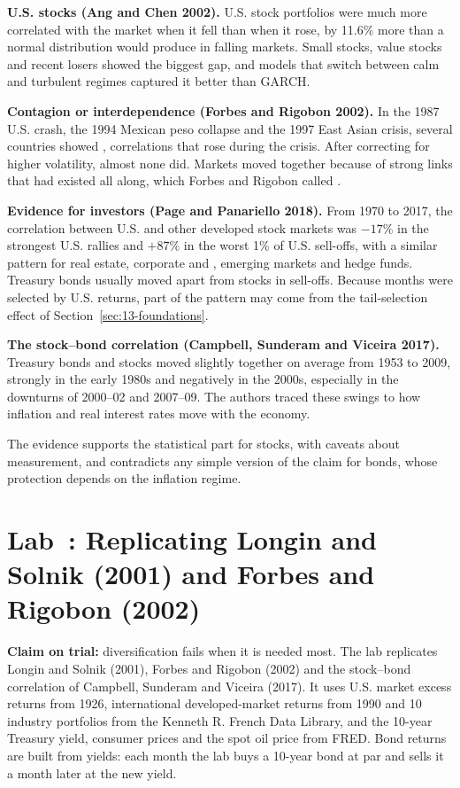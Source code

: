 \textbf{U.S. stocks (Ang and Chen 2002).} U.S. stock portfolios were much more correlated with the market when it fell than when it rose, by 11.6\% more than a normal distribution would produce in falling markets. Small stocks, value stocks and recent losers showed the biggest gap, and models that switch between calm and turbulent regimes captured it better than GARCH.

\textbf{Contagion or interdependence (Forbes and Rigobon 2002).} In the 1987 U.S. crash, the 1994 Mexican peso collapse and the 1997 East Asian crisis, several countries showed , correlations that rose during the crisis. After correcting for higher volatility, almost none did. Markets moved together because of strong links that had existed all along, which Forbes and Rigobon called .

\textbf{Evidence for investors (Page and Panariello 2018).} From 1970 to 2017, the correlation between U.S. and other developed stock markets was $-17\%$ in the strongest U.S. rallies and $+87\%$ in the worst 1\% of U.S. sell-offs, with a similar pattern for real estate, corporate and , emerging markets and hedge funds. Treasury bonds usually moved apart from stocks in sell-offs. Because months were selected by U.S. returns, part of the pattern may come from the tail-selection effect of Section~\ref{sec:13-foundations}.

\textbf{The stock--bond correlation (Campbell, Sunderam and Viceira 2017).} Treasury bonds and stocks moved slightly together on average from 1953 to 2009, strongly in the early 1980s and negatively in the 2000s, especially in the downturns of 2000--02 and 2007--09. The authors traced these swings to how inflation and real interest rates move with the economy.

The evidence supports the statistical part for stocks, with caveats about measurement, and contradicts any simple version of the claim for bonds, whose protection depends on the inflation regime.

\section{Lab~\thechapter: Replicating Longin and Solnik (2001) and Forbes and Rigobon (2002)}
\label{sec:13-lab}

\textbf{Claim on trial:} diversification fails when it is needed most. The lab replicates Longin and Solnik (2001), Forbes and Rigobon (2002) and the stock--bond correlation of Campbell, Sunderam and Viceira (2017). It uses U.S. market excess returns from 1926, international developed-market returns from 1990 and 10 industry portfolios from the Kenneth R. French Data Library, and the 10-year Treasury yield, consumer prices and the spot oil price from FRED. Bond returns are built from yields: each month the lab buys a 10-year bond at par and sells it a month later at the new yield.

